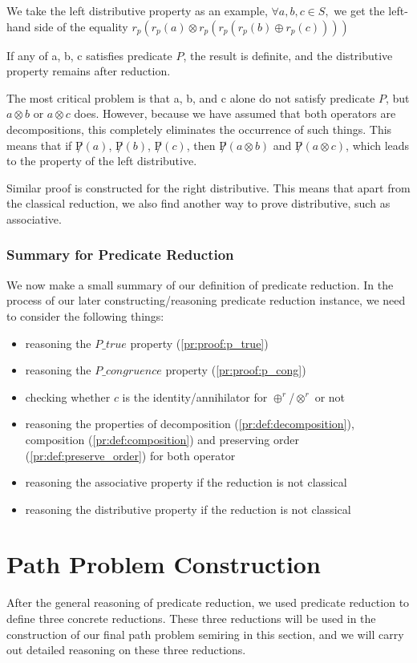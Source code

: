 \documentclass[a4paper,12pt,twoside,openright]{report}
\begin{document}
We take the left distributive property as an example, $\forall a,b,c \in S,$ we get the left-hand side of the equality $r_p(r_p(a) \otimes r_p(r_p(r_p(b) \oplus r_p(c))))$

If any of a, b, c satisfies predicate $P$, the result is definite, and the distributive property remains after reduction.

The most critical problem is that a, b, and c alone do not satisfy predicate $P$, but $a \otimes b$ or $a \otimes c$ does. However, because we have assumed that both operators are decompositions, this completely eliminates the occurrence of such things. This means that if $\not P(a)$, $\not P(b)$, $\not P(c)$, then $\not P(a \otimes b)$ and $\not P(a \otimes c)$, which leads to the property of the left distributive.

Similar proof is constructed for the right distributive. This means that apart from the classical reduction, we also find another way to prove distributive, such as associative.

\subsubsection{Summary for Predicate Reduction}
We now make a small summary of our definition of predicate reduction. 
In the process of our later constructing/reasoning predicate reduction instance, we need to consider the following things:
\begin{itemize}
  \item reasoning the $P\_true$ property (\ref{pr:proof:p_true})
  \item reasoning the $P\_congruence$ property (\ref{pr:proof:p_cong})
  \item checking whether $c$ is the identity/annihilator for $\oplus^r$/$\otimes^r$ or not
  \item reasoning the properties of decomposition (\ref{pr:def:decomposition}), composition (\ref{pr:def:composition}) and preserving order (\ref{pr:def:preserve_order}) for both operator
  \item reasoning the associative property if the reduction is not classical
  \item reasoning the distributive property if the reduction is not classical
\end{itemize}

\section{Path Problem Construction}
After the general reasoning of predicate reduction, we used predicate reduction to define three concrete reductions. These three reductions will be used in the construction of our final path problem semiring in this section, and we will carry out detailed reasoning on these three reductions. 
\end{document}
